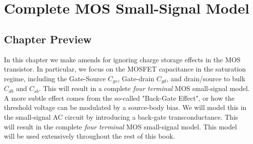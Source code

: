 \chapter{Complete MOS Small-Signal Model}
\label{ch:ch10_mos_ss_ac}
\graphicspath{{./figs_mos_ss_ac/}}
\section{Chapter Preview}
In this chapter we make amends for ignoring charge storage effects in the MOS transistor.  In particular, we focus on the MOSFET capacitance in the saturation regime, including the Gate-Source $C_{gs}$, Gate-drain $C_{gd}$, and drain/source to bulk $C_{db}$ and $C_{sb}$.  This will result in a complete \emph{four terminal} MOS small-signal model.  
A more subtle effect comes from the so-called "Back-Gate Effect", or how the threshold voltage can be modulated by a source-body bias.  We will model this in the small-signal AC circuit by introducing a back-gate transconductance.  This will result in the complete \emph{four terminal} MOS small-signal model.  This model will be used extensively throughout the rest of this book.
%
%
%
% 
